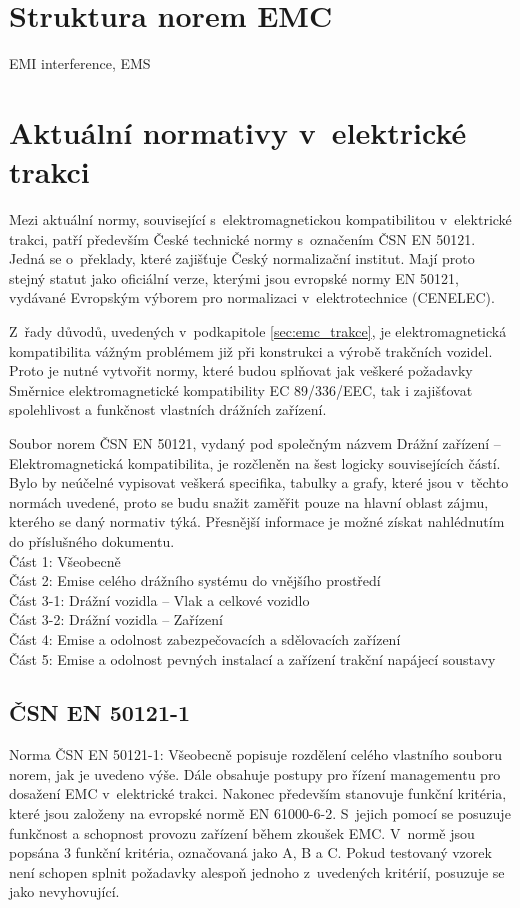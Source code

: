 \section{Struktura norem EMC}
EMI interference, EMS
\newpage

\section{Aktuální normativy v~elektrické trakci} \label{sec:emc_normy_trakce}
Mezi aktuální normy, související s~elektromagnetickou kompatibilitou v~elektrické trakci, patří především České technické normy s~označením ČSN EN 50121. Jedná se o~překlady, které zajišťuje Český normalizační institut. Mají proto stejný statut jako oficiální verze, kterými jsou evropské normy EN 50121, vydávané Evropským výborem pro normalizaci v~elektrotechnice (CENELEC). 

 Z~řady důvodů, uvedených v~podkapitole \ref{sec:emc_trakce},  je elektromagnetická kompatibilita vážným problémem již při konstrukci a výrobě trakčních vozidel. Proto je nutné vytvořit normy, které budou splňovat jak veškeré požadavky Směrnice elektromagnetické kompatibility EC 89/336/EEC, tak i zajišťovat spolehlivost a funkčnost vlastních drážních zařízení.

Soubor norem ČSN EN 50121, vydaný pod společným názvem Drážní zařízení – Elektromagnetická kompatibilita, je rozčleněn na šest logicky souvisejících částí. Bylo by neúčelné vypisovat veškerá specifika, tabulky a grafy, které jsou v~těchto normách uvedené, proto se budu snažit zaměřit pouze na hlavní oblast zájmu, kterého se daný normativ týká. Přesnější informace je možné získat nahlédnutím do příslušného dokumentu. \bigskip \\
Část 1: Všeobecně\\
Část 2: Emise celého drážního  systému do vnějšího prostředí\\
Část 3-1: Drážní vozidla – Vlak a celkové vozidlo\\
Část 3-2: Drážní vozidla – Zařízení\\
Část 4: Emise a odolnost zabezpečovacích a sdělovacích zařízení\\
Část 5: Emise a odolnost pevných instalací a zařízení trakční napájecí soustavy\\

\subsection{ČSN EN 50121-1}
Norma ČSN EN 50121-1: Všeobecně popisuje rozdělení celého vlastního souboru norem, jak je uvedeno výše. Dále obsahuje postupy pro řízení managementu pro dosažení EMC v~elektrické trakci. Nakonec především stanovuje funkční kritéria, které jsou založeny na evropské normě EN 61000-6-2. S~jejich pomocí se posuzuje funkčnost a schopnost provozu zařízení během zkoušek EMC. V~normě jsou popsána 3 funkční kritéria, označovaná jako A, B a C. Pokud testovaný vzorek není schopen splnit požadavky alespoň jednoho z~uvedených kritérií, posuzuje se jako nevyhovující.

